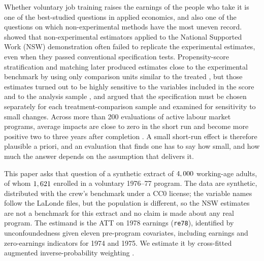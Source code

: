 \documentclass[11pt]{article}
\newcommand{\var}[1]{\texttt{#1}}
\begin{document}
Whether voluntary job training raises the earnings of the people who take it is one of the
best-studied questions in applied economics, and also one of the questions on which
non-experimental methods have the most uneven record. \citet{lalonde1986} showed that
non-experimental estimators applied to the National Supported Work (NSW) demonstration
often failed to replicate the experimental estimates, even when they passed conventional
specification tests. Propensity-score stratification and matching later produced estimates
close to the experimental benchmark by using only comparison units similar to the treated
\citep{dehejia1999,dehejia2002}, but those estimates turned out to be highly sensitive to the
variables included in the score and to the analysis sample
\citep{smith2005}, and \citet{dehejia2005} argued that the specification must be chosen
separately for each treatment-comparison sample and examined for sensitivity to small
changes. Across more than 200 evaluations of active labour market programs, average impacts
are close to zero in the short run and become more positive two to three years after
completion \citep{card2018}. A small short-run effect is therefore plausible a priori, and
an evaluation that finds one has to say how small, and how much the answer depends on the
assumption that delivers it.

This paper asks that question of a synthetic extract of $4,000$ working-age adults, of
whom $1,621$ enrolled in a voluntary 1976--77 program. The data are synthetic,
distributed with the crew's benchmark under a CC0 license; the variable names follow the
LaLonde files, but the population is different, so the NSW estimates are not a benchmark for
this extract and no claim is made about any real program. The estimand is the ATT on 1978
earnings (\var{re78}), identified by unconfoundedness given eleven pre-program covariates,
including earnings and zero-earnings indicators for 1974 and 1975. We estimate it by
cross-fitted augmented inverse-probability weighting \citep{robins1994,bang2005,chernozhukov2018dml}.
\end{document}
